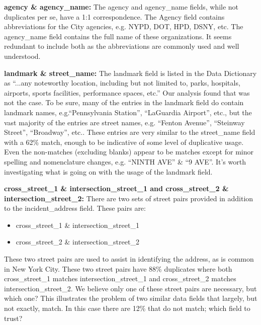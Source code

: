 \documentclass[linenumber]{jdsart}
\begin{document}
\label{sec:agencyname}
\textbf{agency \& agency\_name:} The agency and agency\_name 
fields, while not duplicates per se, have a 1:1 correspondence. The 
Agency field contains abbreviations for the City agencies, e.g. NYPD, 
DOT, HPD, DSNY, etc. The agency\_name field contains the full name 
of these organizations. It seems redundant to include both as 
the abbreviations are commonly used and well understood.


\label{sec:landmark}
\textbf{landmark \& street\_name:} The landmark field is listed 
in the Data Dictionary as ``...any noteworthy location, 
including but not limited to, parks, hospitals, airports, sports 
facilities, performance spaces, etc.'' Our analysis
found that was not the case. To be sure, many of the entries in 
the landmark field do contain landmark names, e.g.``Pennsylvania 
Station'', ``LaGuardia Airport'', etc.,  but the vast majority 
of the entries are street names, e.g. ``Fenton Avenue'', ``Steinway 
Street'', ``Broadway'', etc.. These entries are very similar to the 
street\_name field with a 62\% match, enough to be indicative 
of some level of duplicative usage. Even the non-matches 
(excluding blanks) appear to be matches except for 
minor spelling and nomenclature changes, 
e.g. ``NINTH AVE'' \& ``9 AVE''. It's worth investigating what is going on
with the usage of the landmark field.

	
\label{sec:cross-street}
\textbf{cross\_street\_1 \& intersection\_street\_1 and cross\_street\_2 
\& intersection\_street\_2: } There are two sets of street pairs provided 
in addition to the incident\_address field. These pairs are:


\begin{itemize}
	\item cross\_street\_1 \& intersection\_street\_1
	
	\item cross\_street\_2 \& intersection\_street\_2
\end{itemize}

	
These two street pairs are used to assist in identifying the address, 
as is common in New York City. These two street pairs
have 88\% duplicates where both cross\_street\_1 matches 
intersection\_street\_1 and cross\_street\_2 
matches intersection\_street\_2. We believe only one of these
street pairs are necessary, but which one? This illustrates the 
problem of two similar data fields that largely, but not exactly, match. In
this case there are 12\% that do not match; which field to trust?
\end{document}
